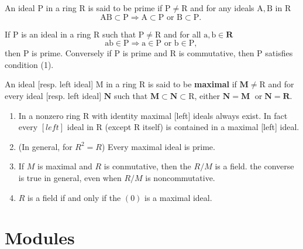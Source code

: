 An ideal P in a ring R is said to be prime if $\mathrm{P} \neq \mathrm{R}$ and for any ideals $\mathrm{A}, \mathrm{B}$ in R
$$
\mathrm{AB} \subset \mathrm{P} \Rightarrow \mathrm{A} \subset \mathrm{P} \text { or } \mathrm{B} \subset \mathrm{P} \text {. }
$$
\begin{theo}
If P is an ideal in a ring R such that $\mathrm{P} \neq \mathrm{R}$ and for all $\mathrm{a}, \mathrm{b} \in \mathbf{R}$
$$
\mathrm{ab} \in \mathrm{P} \Rightarrow \mathrm{a} \in \mathrm{P} \text { or } \mathrm{b} \in \mathrm{P} \text {, }
$$
then P is prime. Conversely if P is prime and R is commutative, then P satisfies condition (1).
\end{theo}

An ideal [resp. left ideal] M in a ring R is said to be \textbf{maximal} if $\mathbf{M} \neq \mathrm{R}$ and for every ideal [resp. left ideal] $\mathbf{N}$ such that $\mathbf{M} \subset \mathbf{N} \subset \mathrm{R}$, either $\mathbf{N}=\mathbf{M}$ $\operatorname{or} \mathbf{N}=\mathbf{R}$.

\begin{theo}
    \begin{enumerate}
        \item In a nonzero ring R with identity maximal [left] ideals always exist. In fact every $[l e f t]$ ideal in R (except R itself) is contained in a maximal [left] ideal.
        \item (In general, for $R^2 = R$) Every maximal ideal is prime. 
        \item If $M$ is maximal and $R$ is conmutative, then the $R/M$ is a field. the converse is true in general, even when $R/M$ is noncommutative.
        \item $R$ is a field if and only if the $(0)$ is a maximal ideal.
    \end{enumerate}
\end{theo}






\section{Modules}

